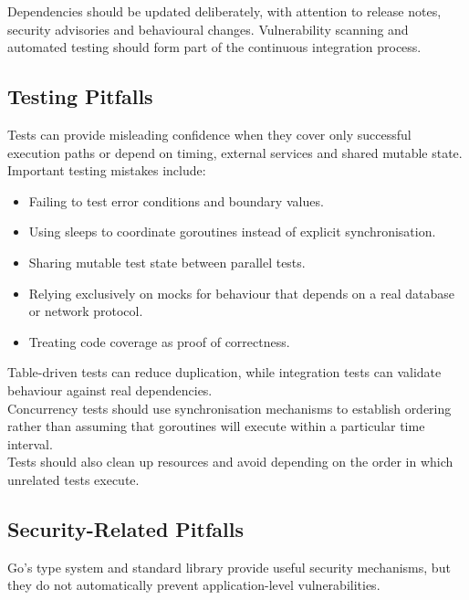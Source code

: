 Dependencies should be updated deliberately, with attention to release notes, security advisories and behavioural changes. Vulnerability scanning and automated testing should form part of the continuous integration process.

\subsection{Testing Pitfalls}

Tests can provide misleading confidence when they cover only successful execution paths or depend on timing, external services and shared mutable state.\\

Important testing mistakes include:

\begin{itemize}
    \item Failing to test error conditions and boundary values.
    \item Using sleeps to coordinate goroutines instead of explicit synchronisation.
    \item Sharing mutable test state between parallel tests.
    \item Relying exclusively on mocks for behaviour that depends on a real database or network protocol.
    \item Treating code coverage as proof of correctness.
\end{itemize}

Table-driven tests can reduce duplication, while integration tests can validate behaviour against real dependencies.\\

Concurrency tests should use synchronisation mechanisms to establish ordering rather than assuming that goroutines will execute within a particular time interval.\\

Tests should also clean up resources and avoid depending on the order in which unrelated tests execute.\\

\subsection{Security-Related Pitfalls}

Go's type system and standard library provide useful security mechanisms, but they do not automatically prevent application-level vulnerabilities.\\

